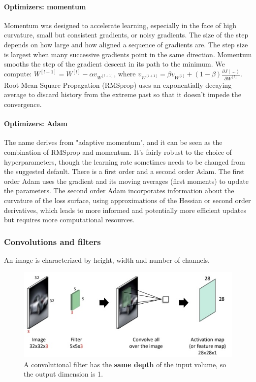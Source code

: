 \paragraph{Optimizers: momentum}
Momentum was designed to accelerate learning, especially in the face of high curvature, small but consistent gradients, or noisy gradients.
The size of the step depends on how large and how aligned a sequence of gradients are.
The step size is largest when many successive gradients point in the same direction.
Momentum smooths the step of the gradient descent in its path to the minimum.
We compute: $W^{[l+1]} = W^{[l]} - \alpha v_{W^{[l + 1]}}$, where $v_{W^{[l + 1]}} = \beta v_{W^{[l]}} + (1-\beta) \frac{\partial J(...)}{\partial W^{[l]}}$.
Root Mean Square Propagation (RMSprop) uses an exponentially decaying average to discard history from the extreme past so that it doesn't impede the convergence.

\paragraph{Optimizers: Adam}
The name derives from "adaptive momentum", and it can be seen as the combination of RMSprop and momentum.
It's fairly robust to the choice of hyperparameters, though the learning rate sometimes needs to be changed from the suggested default.
There is a first order and a second order Adam.
The first order Adam uses the gradient and its moving averages (first moments) to update the parameters.
The second order Adam incorporates information about the curvature of the loss surface, using approximations of the Hessian or second order derivatives, which leads to more informed and potentially more efficient updates but requires more computational resources.

\subsubsection{Convolutions and filters}
An image is characterized by height, width and number of channels.

\begin{figure}[htbp]
  \centering
  \includegraphics[width=0.8\linewidth]{./img/convolution_filter.jpg}
  \caption{A convolutional filter has the \textbf{same depth} of the input volume, so the output dimension is 1.}
\end{figure}

